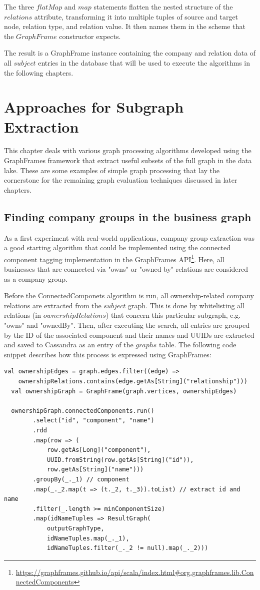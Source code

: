 \documentclass[
        a4paper,     %
        titlepage,   %
        oneside,     %
        parskip      %
]{scrartcl}          %
\begin{document}
    The three $flatMap$ and $map$ statements flatten the nested structure of the $relations$ attribute,
    transforming it into multiple tuples of source and target node, relation type, and relation value.
    It then names them in the scheme that the $GraphFrame$ constructor expects.

    The result is a GraphFrame instance containing the company and relation data of all $subject$
    entries in the database that will be used to execute the algorithms in the following chapters.
    \pagebreak

  \section{Approaches for Subgraph Extraction}
  This chapter deals with various graph processing algorithms developed using the
  GraphFrames framework that extract useful subsets of the full graph in the data lake.
  These are some examples of simple graph processing that lay the cornerstone
  for the remaining graph evaluation techniques discussed in later chapters.

  \subsection{Finding company groups in the business graph}
  As a first experiment with real-world applications, company group extraction
  was a good starting algorithm that could be implemented using the connected component
  tagging implementation in the GraphFrames
  API\footnote{\url{https://graphframes.github.io/api/scala/index.html\#org.graphframes.lib.ConnectedComponents}}.
  Here, all businesses that are connected via "owns" or "owned by"
  relations are considered as a company group.

  Before the ConnectedComponets algorithm is run, all ownership-related company
  relations are extracted from the $subject$ graph. This is done by whitelisting
  all relations (in $ownershipRelations$) that concern this particular subgraph,
  e.g. "owns" and "ownedBy".
  Then, after executing the search, all entries are grouped by the ID of the
  associated component and their names and UUIDs are extracted and saved to Cassandra
  as an entry of the $graphs$ table. The following code snippet describes how
  this process is expressed using GraphFrames:

  \begin{lstlisting}[style=scalaStyle,caption=Company Group Extraction]
  val ownershipEdges = graph.edges.filter((edge) =>
    ownershipRelations.contains(edge.getAs[String]("relationship")))
  val ownershipGraph = GraphFrame(graph.vertices, ownershipEdges)

  ownershipGraph.connectedComponents.run()
		.select("id", "component", "name")
		.rdd
		.map(row => (
			row.getAs[Long]("component"),
			UUID.fromString(row.getAs[String]("id")),
			row.getAs[String]("name")))
		.groupBy(_._1) // component
		.map(_._2.map(t => (t._2, t._3)).toList) // extract id and name
		.filter(_.length >= minComponentSize)
		.map(idNameTuples => ResultGraph(
			outputGraphType,
			idNameTuples.map(_._1),
			idNameTuples.filter(_._2 != null).map(_._2)))
  \end{lstlisting}
\end{document}
